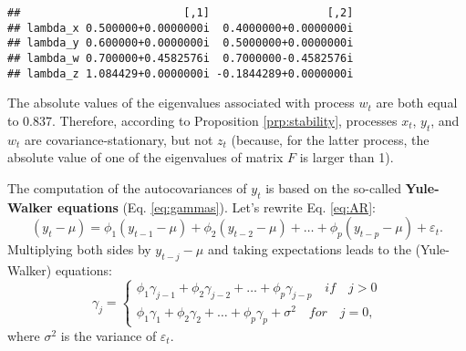 \documentclass[
  12pt,
]{book}
\theoremstyle{definition}
\theoremstyle{definition}
\theoremstyle{definition}
\theoremstyle{definition}
\theoremstyle{remark}
\begin{document}
\begin{verbatim}
##                         [,1]                  [,2]
## lambda_x 0.500000+0.0000000i  0.4000000+0.0000000i
## lambda_y 0.600000+0.0000000i  0.5000000+0.0000000i
## lambda_w 0.700000+0.4582576i  0.7000000-0.4582576i
## lambda_z 1.084429+0.0000000i -0.1844289+0.0000000i
\end{verbatim}

The absolute values of the eigenvalues associated with process \(w_t\) are both equal to 0.837. Therefore, according to Proposition \ref{prp:stability}, processes \(x_t\), \(y_t\), and \(w_t\) are covariance-stationary, but not \(z_t\) (because, for the latter process, the absolute value of one of the eigenvalues of matrix \(F\) is larger than 1).

The computation of the autocovariances of \(y_t\) is based on the so-called \textbf{Yule-Walker equations} (Eq. \eqref{eq:gammas}). Let's rewrite Eq. \eqref{eq:AR}:
\[
(y_t-\mu) = \phi_1 (y_{t-1}-\mu) + \phi_2 (y_{t-2}-\mu) + \dots + \phi_p (y_{t-p}-\mu) + \varepsilon_t.
\]
Multiplying both sides by \(y_{t-j}-\mu\) and taking expectations leads to the (Yule-Walker) equations:
\begin{equation}
\gamma_j = \left\{
\begin{array}{l}
\phi_1 \gamma_{j-1}+\phi_2 \gamma_{j-2}+ \dots + \phi_p \gamma_{j-p} \quad if \quad j>0\\
\phi_1 \gamma_{1}+\phi_2 \gamma_{2}+ \dots + \phi_p \gamma_{p} + \sigma^2 \quad for \quad j=0,
\end{array}
\right.\label{eq:gammas}
\end{equation}
where \(\sigma^2\) is the variance of \(\varepsilon_t\).
\end{document}
